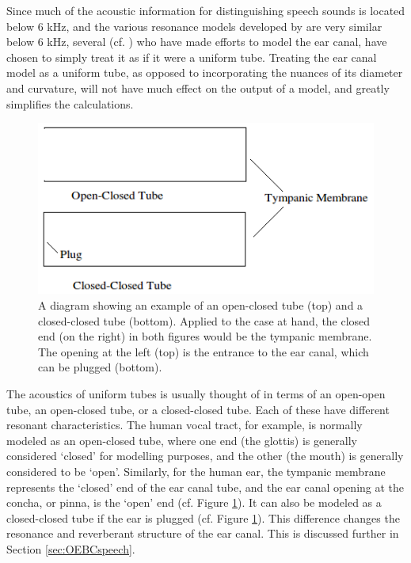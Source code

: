 Since much of the acoustic information for distinguishing speech sounds is located below 6 kHz, and the various resonance models developed by \cite{stinson:89} are very similar below 6 kHz, several (cf. \cite{stinson:89,hansen:97b,stenfelt:07}) who have made efforts to model the ear canal, have chosen to simply treat it as if it were a uniform tube.  Treating the ear canal model as a uniform tube, as opposed to incorporating the nuances of its diameter and curvature, will not have much effect on the output of a model, and greatly simplifies the calculations.

\begin{figure}[t!]
\centering
  \includegraphics{figure/open-closed-tube.png}
  \caption{A diagram showing an example of an open-closed tube (top) and a closed-closed tube (bottom).  Applied to the case at hand, the closed end (on the right) in both figures would be the tympanic membrane.  The opening at the left (top) is the entrance to the ear canal, which can be plugged (bottom).}
  \label{fig:open-closed-tube}
\end{figure}

The acoustics of uniform tubes is usually thought of in terms of an open-open tube, an open-closed tube, or a closed-closed tube.  Each of these have different resonant characteristics. The human vocal tract, for example, is normally modeled as an open-closed tube, where one end (the glottis) is generally considered `closed' for modelling purposes, and the other (the mouth) is generally considered to be `open'.  Similarly, for the human ear, the tympanic membrane represents the `closed' end of the ear canal tube, and the ear canal opening at the concha, or pinna, is the `open' end (cf. Figure \ref{fig:open-closed-tube}).  It can also be modeled as a closed-closed tube if the ear is plugged (cf. Figure \ref{fig:open-closed-tube}). This difference changes the resonance and reverberant structure of the ear canal.  This is discussed further in Section \ref{sec:OEBCspeech}.  

